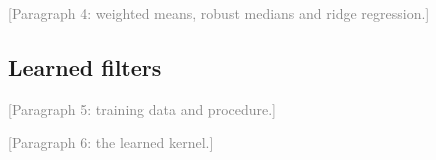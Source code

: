 \documentclass[preprint,12pt,authoryear]{elsarticle}
\newcommand{\towrite}[1]{\textcolor{gray}{[#1]}}
\begin{document}
\towrite{Paragraph 4: weighted means, robust medians and ridge regression.}

\subsection{Learned filters}
\label{sec:filters-learned}

\towrite{Paragraph 5: training data and procedure.}

\towrite{Paragraph 6: the learned kernel.}
\end{document}
